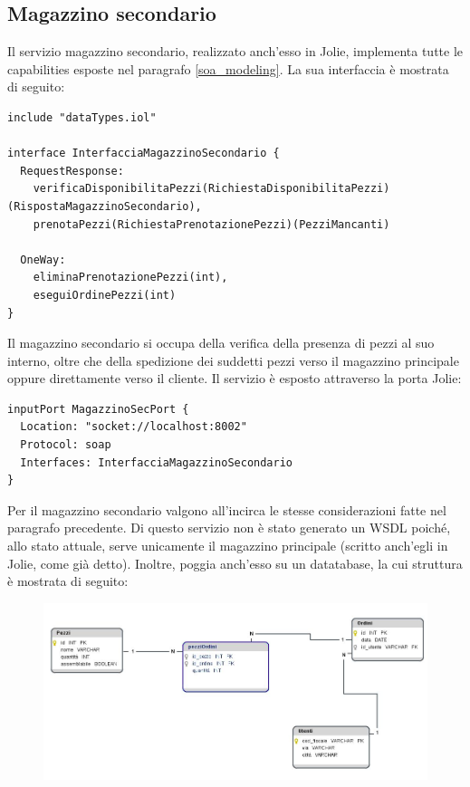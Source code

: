 \documentclass[twoside]{article}
\begin{document}
\subsection{Magazzino secondario}
Il servizio magazzino secondario, realizzato anch'esso in Jolie, implementa tutte le
capabilities esposte nel paragrafo \ref{soa_modeling}.
La sua interfaccia è mostrata di seguito:
\begin{lstlisting}
include "dataTypes.iol"

interface InterfacciaMagazzinoSecondario {
  RequestResponse:
    verificaDisponibilitaPezzi(RichiestaDisponibilitaPezzi)(RispostaMagazzinoSecondario),
    prenotaPezzi(RichiestaPrenotazionePezzi)(PezziMancanti)
  
  OneWay:
    eliminaPrenotazionePezzi(int),
    eseguiOrdinePezzi(int) 
}
\end{lstlisting}
Il magazzino secondario si occupa della verifica della presenza di pezzi al suo interno,
oltre che della spedizione dei suddetti pezzi verso il magazzino principale oppure
direttamente verso il cliente. Il servizio è esposto attraverso la porta Jolie:
\begin{lstlisting}
inputPort MagazzinoSecPort {
  Location: "socket://localhost:8002"
  Protocol: soap
  Interfaces: InterfacciaMagazzinoSecondario
}
\end{lstlisting}
Per il magazzino secondario valgono all'incirca le stesse considerazioni fatte nel
paragrafo precedente. Di questo servizio non è stato generato un WSDL poiché, allo
stato attuale, serve unicamente il magazzino principale (scritto anch'egli in Jolie, come
già detto).
Inoltre, poggia anch'esso su un datatabase, la cui struttura è mostrata di seguito:

\begin{figure}[!htbp]
\centering
\includegraphics[width=13cm]{modello_logico_magazzino2.png}
\label{fig:2}
\end{figure}
\end{document}
